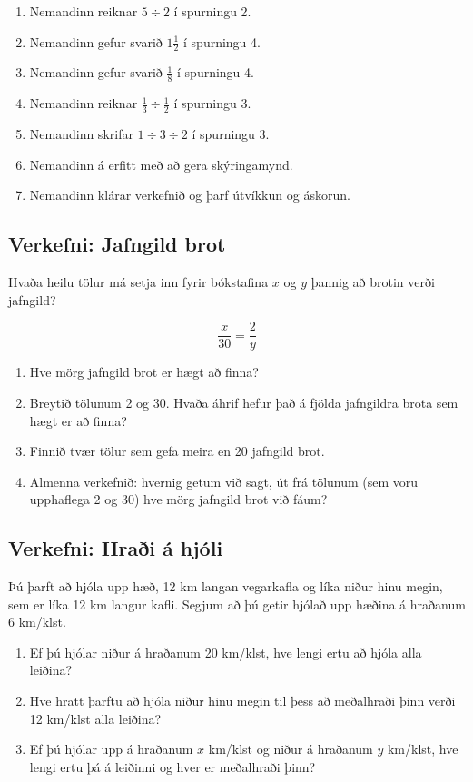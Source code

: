 \documentclass[
  icelandic,
]{book}
\providecommand{\tightlist}{%
  \setlength{\itemsep}{0pt}\setlength{\parskip}{0pt}}
\begin{document}
\begin{enumerate}
\def\labelenumi{\arabic{enumi}.}
\tightlist
\item
  Nemandinn reiknar \(5 \div 2\) í spurningu 2.
\item
  Nemandinn gefur svarið \(1 \frac{1}{2}\) í spurningu 4.
\item
  Nemandinn gefur svarið \(\frac{1}{8}\) í spurningu 4.
\item
  Nemandinn reiknar \(\frac{1}{3} \div \frac{1}{2}\) í spurningu 3.
\item
  Nemandinn skrifar \(1 \div 3 \div 2\) í spurningu 3.
\item
  Nemandinn á erfitt með að gera skýringamynd.
\item
  Nemandinn klárar verkefnið og þarf útvíkkun og áskorun.
\end{enumerate}

\subsection{Verkefni: Jafngild brot}\label{verkefni-jafngild-brot}

Hvaða heilu tölur má setja inn fyrir bókstafina \(x\) og \(y\) þannig að brotin verði jafngild?

\[
 \dfrac{x}{30} = \dfrac{2}{y} 
\]

\begin{enumerate}
\def\labelenumi{\alph{enumi}.}
\tightlist
\item
  Hve mörg jafngild brot er hægt að finna?
\item
  Breytið tölunum 2 og 30. Hvaða áhrif hefur það á fjölda jafngildra brota sem hægt er að finna?
\item
  Finnið tvær tölur sem gefa meira en 20 jafngild brot.
\item
  Almenna verkefnið: hvernig getum við sagt, út frá tölunum (sem voru upphaflega 2 og 30) hve mörg jafngild brot við fáum?
\end{enumerate}

\subsection{Verkefni: Hraði á hjóli}\label{verkefni-hrauxf0i-uxe1-hjuxf3li}

Þú þarft að hjóla upp hæð, 12 km langan vegarkafla og líka niður hinu megin, sem er líka 12 km langur kafli. Segjum að þú getir hjólað upp hæðina á hraðanum 6 km/klst.

\begin{enumerate}
\def\labelenumi{\alph{enumi}.}
\tightlist
\item
  Ef þú hjólar niður á hraðanum 20 km/klst, hve lengi ertu að hjóla alla leiðina?
\item
  Hve hratt þarftu að hjóla niður hinu megin til þess að meðalhraði þinn verði 12 km/klst alla leiðina?
\item
  Ef þú hjólar upp á hraðanum \(x\) km/klst og niður á hraðanum \(y\) km/klst, hve lengi ertu þá á leiðinni og hver er meðalhraði þinn?
\end{enumerate}
\end{document}
